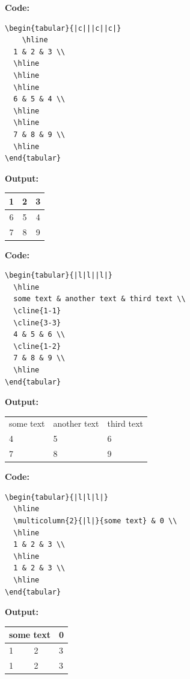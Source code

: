 \documentclass{book}
\newcommand{\myc}{\noindent\textbf{{\color{blue} Code}:}}
\newcommand{\myo}{\noindent\textbf{{\color{blue} Output}:\\}}
\begin{document}
\myc
\begin{lstlisting}
\begin{tabular}{|c|||c||c|}
    \hline
  1 & 2 & 3 \\
  \hline
  \hline
  \hline
  6 & 5 & 4 \\
  \hline
  \hline
  7 & 8 & 9 \\
  \hline
\end{tabular}
\end{lstlisting}

\myo
\begin{tabular}{|c|||c||c|}
    \hline
  1 & 2 & 3 \\
  \hline
  \hline
  \hline
  6 & 5 & 4 \\
  \hline
  \hline
  7 & 8 & 9 \\
  \hline
\end{tabular}


\myc
\begin{lstlisting}
\begin{tabular}{|l|l||l|}
  \hline
  some text & another text & third text \\
  \cline{1-1}
  \cline{3-3}
  4 & 5 & 6 \\
  \cline{1-2}
  7 & 8 & 9 \\
  \hline
\end{tabular}
\end{lstlisting}

\myo
\begin{tabular}{|l|l||l|}
  \hline
  some text & another text & third text \\
  \cline{1-1}
  \cline{3-3}
  4 & 5 & 6 \\
  \cline{1-2}
  7 & 8 & 9 \\
  \hline
\end{tabular}

\myc
\begin{lstlisting}
\begin{tabular}{|l|l|l|}
  \hline
  \multicolumn{2}{|l|}{some text} & 0 \\
  \hline
  1 & 2 & 3 \\
  \hline
  1 & 2 & 3 \\
  \hline
\end{tabular}
\end{lstlisting}

\myo
\begin{tabular}{|l|l|l|}
  \hline
  \multicolumn{2}{|l|}{some text} & 0 \\
  \hline
  1 & 2 & 3 \\
  \hline
  1 & 2 & 3 \\
  \hline
\end{tabular}
\end{document}
